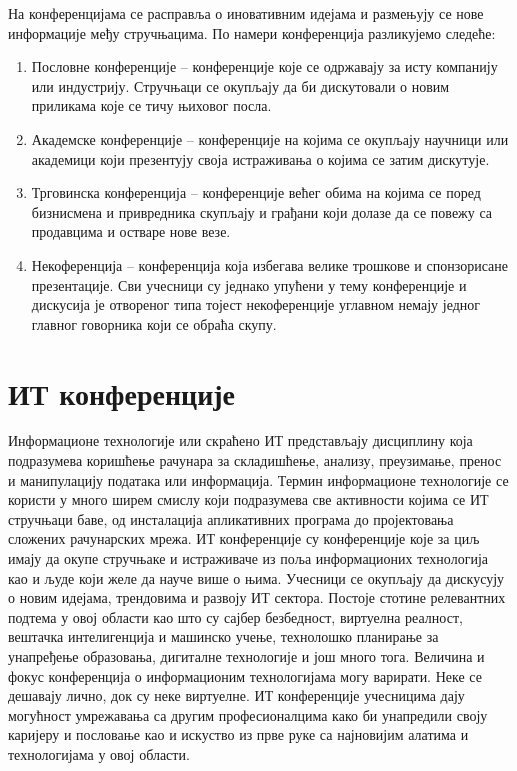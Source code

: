 \documentclass[12pt]{article}
\begin{document}
На конференцијама се расправља о иновативним идејама и размењују се нове информације међу стручњацима. По намери конференција разликујемо следеће:
\begin{enumerate}
    \item Пословне конференције – конференције које се одржавају за исту компанију или индустрију. Стручњаци се окупљају да би дискутовали о новим приликама које се тичу њиховог посла.
    \item Академске конференције – конференције на којима се окупљају научници или академици који презентују своја истраживања о којима се затим дискутује.
    \item Трговинска конференција – конференције већег обима на којима се поред бизнисмена и привредника скупљају и грађани који долазе да се повежу са продавцима и остваре нове везе.
    \item Некоференција – конференција која избегава велике трошкове и спонзорисане презентације. Сви учесници су једнако упућени у тему конференције и дискусија је отвореног типа тојест некоференције углавном немају једног главног говорника који се обраћа скупу.
\end{enumerate}

\pagebreak

\section{ИТ конференције}
Информационе технологије или скраћено ИТ представљају дисциплину која подразумева коришћење рачунара за складишћење, анализу, преузимање, пренос и манипулацију података или информација. Термин информационе технологије се користи у много ширем смислу који подразумева све активности којима се ИТ стручњаци баве, од инсталација апликативних програма до пројектовања сложених рачунарских мрежа.
ИТ конференције су конференције које за циљ имају да окупе стручњаке и истраживаче из поља информационих технологија као и људе који желе да науче више о њима. Учесници се окупљају да дискусују о новим идејама, трендовима и развоју ИТ сектора. Постоје стотине релевантних подтема у овој области као што су сајбер безбедност, виртуелна реалност, вештачка интелигенција и машинско учење, технолошко планирање за унапређење образовања, дигиталне технологије и још много тога. Величина и фокус конференција о информационим технологијама могу варирати. Неке се дешавају лично, док су неке виртуелне. ИТ конференције учесницима дају могућност умрежавања са другим професионалцима како би унапредили своју каријеру и пословање као и искуство из прве руке са најновијим алатима и технологијама у овој области.
\end{document}
